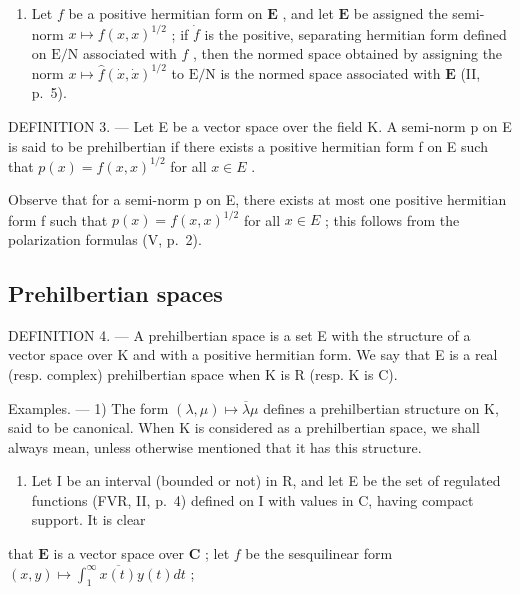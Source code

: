 \begin{enumerate}
\def\labelenumi{\arabic{enumi})}
\setcounter{enumi}{1}
\tightlist
\item
  Let \(f\) be a positive hermitian form on \(\mathbf{E}\) , and let \(\mathbf{E}\) be assigned the semi-norm \(x \mapsto f(x, x)^{1/2}\) ; if \(\dot{f}\) is the positive, separating hermitian form defined on \(\mathrm{E/N}\) associated with \(f\) , then the normed space obtained by assigning the norm \(x \mapsto \hat{f}(\dot{x}, \dot{x})^{1/2}\) to \(\mathrm{E/N}\) is the normed space associated with \(\mathbf{E}\) (II, p.~5).
\end{enumerate}

DEFINITION 3. --- Let E be a vector space over the field K. A semi-norm p on E is said to be prehilbertian if there exists a positive hermitian form f on E such that \(p(x) = f(x, x)^{1/2}\) for all \(x \in E\) .

Observe that for a semi-norm p on E, there exists at most one positive hermitian form f such that \(p(x) = f(x, x)^{1/2}\) for all \(x \in E\) ; this follows from the polarization formulas (V, p.~2).

\subsection{Prehilbertian spaces}

DEFINITION 4. --- A prehilbertian space is a set E with the structure of a vector space over K and with a positive hermitian form. We say that E is a real (resp. complex) prehilbertian space when K is R (resp. K is C).

Examples. --- 1) The form \((\lambda, \mu) \mapsto \overline{\lambda}\mu\) defines a prehilbertian structure on K, said to be canonical. When K is considered as a prehilbertian space, we shall always mean, unless otherwise mentioned that it has this structure.

\begin{enumerate}
\def\labelenumi{\arabic{enumi})}
\setcounter{enumi}{1}
\tightlist
\item
  Let I be an interval (bounded or not) in R, and let E be the set of regulated functions (FVR, II, p.~4) defined on I with values in C, having compact support. It is clear
\end{enumerate}

that \(\mathbf{E}\) is a vector space over \(\mathbf{C}\) ; let \(f\) be the sesquilinear form \((x, y) \mapsto \int_{1}^{\infty} \overline{x(t)} y(t) dt\) ;


